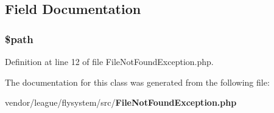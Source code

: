 \subsection{Field Documentation}
\subsubsection[{\$path}]{\setlength{\rightskip}{0pt plus 5cm}\${\bf path}\hspace{0.3cm}{\ttfamily [protected]}}\label{class_league_1_1_flysystem_1_1_file_not_found_exception_a0a4baf0b22973c07685c3981f0d17fc4}


Definition at line 12 of file File\+Not\+Found\+Exception.\+php.



The documentation for this class was generated from the following file\+:\begin{DoxyCompactItemize}
\item 
vendor/league/flysystem/src/{\bf File\+Not\+Found\+Exception.\+php}\end{DoxyCompactItemize}
